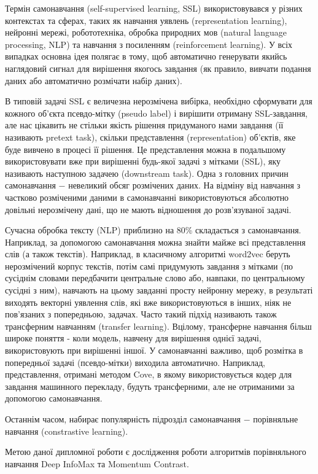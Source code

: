 


Термін самонавчання (self-supervised learning, SSL) використовувався у різних контекстах та сферах, таких як навчання уявлень (representation learning), нейронні мережі, робототехніка, обробка природних мов (natural language processing, NLP) та навчання з посиленням (reinforcement learning). У всіх випадках основна ідея полягає в тому, щоб автоматично генерувати якийсь наглядовий сигнал для вирішення якогось завдання (як правило, вивчати подання даних або автоматично розмічати набір даних).

В типовій задачі SSL є величезна нерозмічена вибірка, необхідно сформувати для кожного об'єкта псевдо-мітку (pseudo label) і вирішити отриману SSL-завдання, але нас цікавить не стільки якість рішення придуманого нами завдання (її називають pretext task), скільки представлення (representation) об'єктів, яке буде вивчено в процесі її рішення. Це представлення можна в подальшому використовувати вже при вирішенні будь-якої задачі з мітками (SSL), яку називають наступною задачею (downstream task). Одна з головних причин самонавчання $-$ невеликий обсяг розмічених даних. На відміну від навчання з частково розміченими даними в самонавчанні використовуються абсолютно довільні нерозмічену дані, що не мають відношення до розв'язуваної задачі.

Сучасна обробка тексту (NLP) приблизно на 80\% складається з самонавчання. Наприклад, за допомогою самонавчання можна знайти майже всі представлення слів (а також текстів). Наприклад, в класичному алгоритмі word2vec беруть нерозмічений корпус текстів, потім самі придумують завдання з мітками (по сусіднім словами передбачити центральне слово або, навпаки, по центральному сусідні з ним), навчають на цьому завданні просту нейронну мережу, в результаті виходять векторні уявлення слів, які вже використовуються в інших, ніяк не пов'язаних з попередньою, задачах. Часто такий підхід називають також трансферним навчанням (transfer learning). Вцілому, трансферне навчання більш широке поняття - коли модель, навчену для вирішення однієї задачі, використовують при вирішенні іншої. У самонавчанні важливо, щоб розмітка в попередньої задачі (псевдо-мітки) виходила автоматично. Наприклад, представлення, отримані методом Cove, в якому використовується кодер для завдання машинного перекладу, будуть трансферними, але не отриманими за допомогою самонавчання.

Останнім часом, набирає популярність підрозділ самонавчання $-$ порівняльне навчання (constrastive learning).

Метою даної дипломної роботи є дослідження роботи алгоритмів порівняльного навчання Deep InfoMax та Momentum Contrast.

